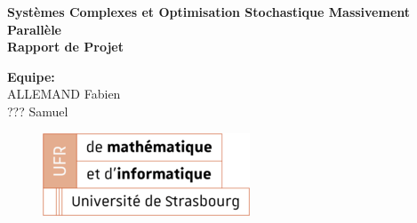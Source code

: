 \documentclass{article}
\begin{document}
\thispagestyle{empty}
\addtocounter{page}{-1}
\begin{center}
	\baselineskip=50pt
	\vspace*{1cm}
	\textbf{{\Huge Systèmes Complexes et Optimisation Stochastique Massivement Parallèle}}\\
	\vspace*{0.25cm}
	\textbf{{\Huge Rapport de Projet}}\\
	\vspace*{0.25cm}
	\begin{minipage}[c]{.46\linewidth}
        \centering
        \textbf{Equipe:}\\
		ALLEMAND Fabien\\
        ??? Samuel
    \end{minipage}
\end{center}
\vspace{0.1cm}

\begin{figure}[H]
\centering
\centerline{\includegraphics[scale=1.]{img/logo_UFR_2.png}}
\end{figure}

\newpage
\end{document}
